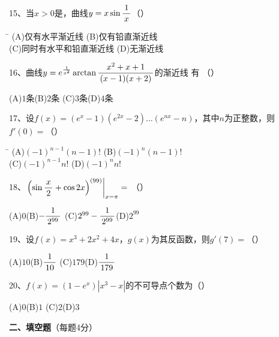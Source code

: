 \bigskip

15、当$x>0$是，曲线$y=x\sin\displaystyle\frac{\,{1}\,}{\,{x}\,}$（\quad）%
\begin{tabbing}
	\hspace{8cm}\=\kill
	\quad\quad\quad(A)\;仅有水平渐近线 \> 
	(B)\;仅有铅直渐近线 \\ 
	\quad\quad\quad(C)\;同时有水平和铅直渐近线\>
	(D)\;无渐近线
\end{tabbing}

\bigskip

16、曲线$y=e^{\frac1{x^2}}\arctan\displaystyle\frac{\,{x^2+x+1}\,}{\,{(x-1)(x+2)}\,}$的渐近线
有
（\quad）%

\quad (A)\;$1$条\quad\quad\quad(B)\;$2$条
\quad\quad\quad (C)\;$3$条\quad\quad\quad(D)\;$4$条

\bigskip

17、设$f(x)=(e^x-1)(e^{2x}-2)\ldots(e^{nx}-n)$，其中$n$为正整数，则
$f'(0)=$（\quad）%
\begin{tabbing}
	\hspace{8cm}\=\kill
	\quad\quad\quad(A)\;$(-1)^{n-1}(n-1)!$ \> 
	(B)\;$(-1)^{n}(n-1)!$ \\ 
	\quad\quad\quad(C)\;$(-1)^{n-1}n!$\>
	(D)\;$(-1)^{n}n!$
\end{tabbing}

\bigskip

18、$\left.\left(\sin\displaystyle\frac{\,{x}\,}{\,{2}\,}+\cos2x\right)^{(99)}\right|_{x=\pi}=$
（\quad）%

\quad (A)\;$0$\quad\quad\quad(B)\;$-\displaystyle\frac{\,{1}\,}{\,{2^{99}}\,}$
\quad\quad\quad (C)\;$2^{99}-\displaystyle\frac{\,{1}\,}{\,{2^{99}}\,}$\quad\quad\quad(D)\;$2^{99}$

\bigskip

19、设$f(x)=x^3+2x^2+4x$，$g(x)$为其反函数，则$g'(7)=$（\quad）%

\quad (A)\;$10$\quad\quad\quad(B)\;$\displaystyle\frac{\,{1}\,}{\,{10}\,}$
\quad\quad\quad (C)\;$179$\quad\quad\quad(D)\;$\displaystyle\frac{\,{1}\,}{\,{179}\,}$

\bigskip

20、$f(x)=(1-e^x)|x^3-x|$的不可导点个数为（\quad）%

\quad (A)\;$0$\quad\quad\quad(B)\;$1$
\quad\quad\quad (C)\;$2$\quad\quad\quad(D)\;$3$

\bigskip

{\bf 二、填空题}（每题4分）

\bigskip


